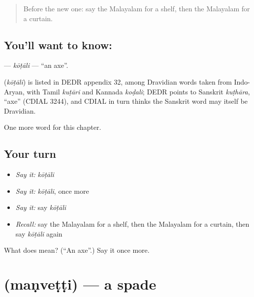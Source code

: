 \label{lesson:ML-C328-kotali}



\begin{quote}
Before the new one: say the Malayalam for a shelf, then the Malayalam for a curtain.
\end{quote}

\subsection*{You'll want to know: }
\textbf{} — \emph{kōṭāli} — \textquotedblleft{}an axe\textquotedblright{}.

\begin{cousinweb}
\textbf{} (\emph{kōṭāli}) is listed in DEDR appendix 32, among Dravidian words taken from Indo-Aryan, with Tamil \emph{kuṭāri} and Kannada \emph{koḍali}; DEDR points to Sanskrit \emph{kuṭhāra}, \textquotedblleft{}axe\textquotedblright{} (CDIAL 3244), and CDIAL in turn thinks the Sanskrit word may itself be Dravidian.
\end{cousinweb}

\begin{grammarlens}[title={What you've built}]
One more word for this chapter.
\end{grammarlens}

\subsection*{Your turn}
\begin{itemize}
\raggedright
  \item \emph{Say it:} \emph{kōṭāli}
  \item \emph{Say it:} \emph{kōṭāli}, once more
  \item \emph{Say it:} say \emph{kōṭāli}
  \item \emph{Recall:} say the Malayalam for a shelf, then the Malayalam for a curtain, then say \emph{kōṭāli} again
\end{itemize}

\begin{tcolorbox}[breakable,colback=teal!4,colframe=teal!35!black,title={Before you move on}]
What does  mean? (\textquotedblleft{}An axe\textquotedblright{}.) Say it once more.
\end{tcolorbox}
\section[\texorpdfstring{\ml{മൺവെട്ടി} (maṇveṭṭi)}{മൺവെട്ടി (maṇveṭṭi)}]{ (maṇveṭṭi) — a spade}

